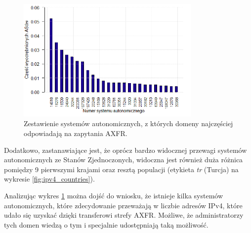 \begin{figure}[h!]
	\centering
	\includegraphics[width=0.80\textwidth]{image/asn_all_no_title}
	\caption{Zestawienie systemów autonomicznych, z których domeny najczęściej odpowiadają na zapytania AXFR.}
	\label{fig:asn_all}
\end{figure}

Dodatkowo, zastanawiające jest, że oprócz bardzo widocznej przewagi systemów autonomicznych ze Stanów Zjednoczonych, widoczna jest
również duża różnica pomiędzy 9 pierwszymi krajami oraz resztą populacji (etykieta \textit{tr} (Turcja) na
wykresie \ref{fig:ipv4_countries}).

Analizując wykres \ref{fig:asn_all} można dojść do wniosku, że istnieje kilka systemów autonomicznych, które zdecydowanie przeważają
w liczbie adresów IPv4, które udało się uzyskać dzięki transferowi strefy AXFR. Możliwe, że administratorzy tych domen wiedzą o tym
i specjalnie udostępniają taką możliwość.

